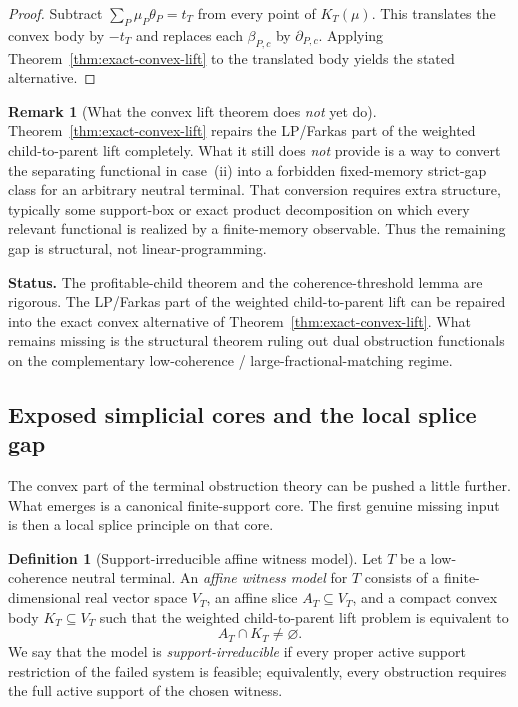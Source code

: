 \documentclass[11pt]{article}
\theoremstyle{definition}
\newtheorem{definition}[theorem]{Definition}
\newtheorem{remark}[theorem]{Remark}
\newcommand{\1}{\mathbf{1}}
\newcommand{\status}[1]{\par\smallskip\noindent\textbf{Status.} #1\par\smallskip}
\begin{document}
\begin{proof}
Subtract $\sum_P \mu_P\theta_P=t_T$ from every point of $K_T(\mu)$.
This translates the convex body by $-t_T$ and replaces each $\beta_{P,c}$ by $\partial_{P,c}$.
Applying Theorem~\ref{thm:exact-convex-lift} to the translated body yields the stated alternative.
\end{proof}

\begin{remark}[What the convex lift theorem does \emph{not} yet do]\label{rem:exact-convex-lift-gap}
Theorem~\ref{thm:exact-convex-lift} repairs the LP/Farkas part of the weighted child-to-parent lift completely.
What it still does \emph{not} provide is a way to convert the separating functional in case~(ii) into a forbidden fixed-memory strict-gap class for an arbitrary neutral terminal.
That conversion requires extra structure, typically some support-box or exact product decomposition on which every relevant functional is realized by a finite-memory observable.
Thus the remaining gap is structural, not linear-programming.
\end{remark}

\status{The profitable-child theorem and the coherence-threshold lemma are rigorous. The LP/Farkas part of the weighted child-to-parent lift can be repaired into the exact convex alternative of Theorem~\ref{thm:exact-convex-lift}. What remains missing is the structural theorem ruling out dual obstruction functionals on the complementary low-coherence / large-fractional-matching regime.}

\subsection*{Exposed simplicial cores and the local splice gap}
The convex part of the terminal obstruction theory can be pushed a little further.
What emerges is a canonical finite-support core.
The first genuine missing input is then a local splice principle on that core.

\begin{definition}[Support-irreducible affine witness model]\label{def:affine-witness-model}
Let $T$ be a low-coherence neutral terminal.
An \emph{affine witness model} for $T$ consists of a finite-dimensional real vector space $V_T$, an affine slice $A_T\subseteq V_T$, and a compact convex body $K_T\subseteq V_T$ such that the weighted child-to-parent lift problem is equivalent to
\[
A_T\cap K_T\neq \varnothing.
\]
We say that the model is \emph{support-irreducible} if every proper active support restriction of the failed system is feasible; equivalently, every obstruction requires the full active support of the chosen witness.
\end{definition}
\end{document}
